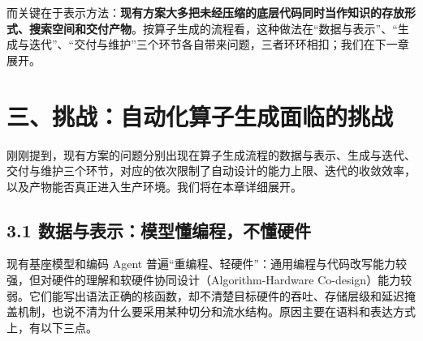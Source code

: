 而关键在于表示方法：\textbf{现有方案大多把未经压缩的底层代码同时当作知识的存放形式、搜索空间和交付产物}。按算子生成的流程看，这种做法在“数据与表示”、“生成与迭代”、“交付与维护”三个环节各自带来问题，三者环环相扣；我们在下一章展开。


\SourceSeparator
\clearpage
\section{三、挑战：自动化算子生成面临的挑战}
刚刚提到，现有方案的问题分别出现在算子生成流程的数据与表示、生成与迭代、交付与维护三个环节，对应的依次限制了自动设计的能力上限、迭代的收敛效率，以及产物能否真正进入生产环境。我们将在本章详细展开。


\begin{DiagramBlock}
\end{DiagramBlock}

\newpage

\subsection{3.1 数据与表示：模型懂编程，不懂硬件}
现有基座模型和编码 Agent 普遍“重编程、轻硬件”：通用编程与代码改写能力较强，但对硬件的理解和软硬件协同设计（Algorithm-Hardware Co-design）能力较弱。它们能写出语法正确的核函数，却不清楚目标硬件的吞吐、存储层级和延迟掩盖机制，也说不清为什么要采用某种切分和流水结构。原因主要在语料和表达方式上，有以下三点。


